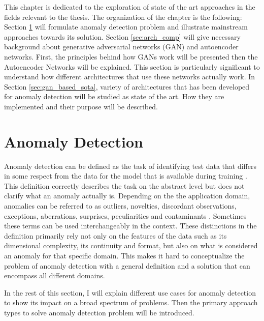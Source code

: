 \begingroup


This chapter is dedicated to the exploration of state of the art approaches in the fields relevant
to the thesis. The organization of the chapter is the following: Section \ref{sec:ad} will formulate
anomaly detection problem and illustrate mainstream approaches towards its solution.  Section \ref{sec:arch_comp} will give
necessary background about generative adversarial networks (GAN) and autoencoder
networks. First, the principles behind how GANs work will be presented then the Autoencoder Networks
 will be explained. This section is particularly significant to understand how different
architectures that use these networks actually work. In Section \ref{sec:gan_based_sota}, variety of 
architectures that has been developed for anomaly detection will be studied as state of the art. 
How they are implemented and their purpose will be described.

\section{Anomaly Detection}
\label{sec:ad}
Anomaly detection can be defined as the task of identifying test data that differs in some respect 
from the data for the model that is available during training \cite{Pimentel:2014:RRN:2588908.2589196}.
This definition correctly describes the task on the abstract level but does not clarify what an anomaly 
actually is. Depending on the the application domain, anomalies can be referred to as outliers, 
novelties, discordant observations, exceptions, aberrations, surprises, peculiarities and
contaminants \cite{Chandola:2009:ADS:1541880.1541882}. Sometimes these terms can be used interchangeably in
the context. These distinctions in the definition primarily rely not only on the features of
the data such as its dimensional complexity, its continuity and format, but also on what is
considered an anomaly for that specific domain. This makes it hard to conceptualize the problem of
anomaly detection with a general definition and a solution that can encompass all different
domains.

In the rest of this section, I will explain different use cases for anomaly detection to show its
impact on a broad spectrum of problems. Then the primary approach types to solve anomaly detection
problem will be introduced.

